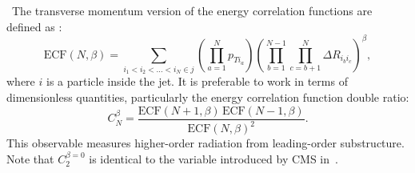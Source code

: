 ~The transverse momentum version of the energy correlation functions are defined as \cite{Larkoski:2013eya}:
%
\begin{equation}
\mathrm{ECF}(N,\beta) = \sum_{i_1 < i_2<\ldots<i_N \in j} \left(\prod_{a=1}^N p_{T i_a}\right)\left( \prod_{b=1}^{N-1} \prod_{c=b+1}^N \Delta R_{i_b i_c}\right)^\beta,
\end{equation}
%
where $i$ is a particle inside the jet. It is preferable to work in terms of dimensionless quantities, particularly the energy correlation function double ratio:
%
\begin{equation}
C_N^{\beta} = \frac{\mathrm{ECF}(N+1,\beta)\,\mathrm{ECF}(N-1,\beta)}{\mathrm{ECF}(N,\beta)^2}.
\end{equation}
%
This observable measures higher-order radiation from leading-order substructure. Note that $C_2^{\beta=0}$ is identical to the variable \ptd introduced by CMS in~\cite{Chatrchyan:2012sn}. 









